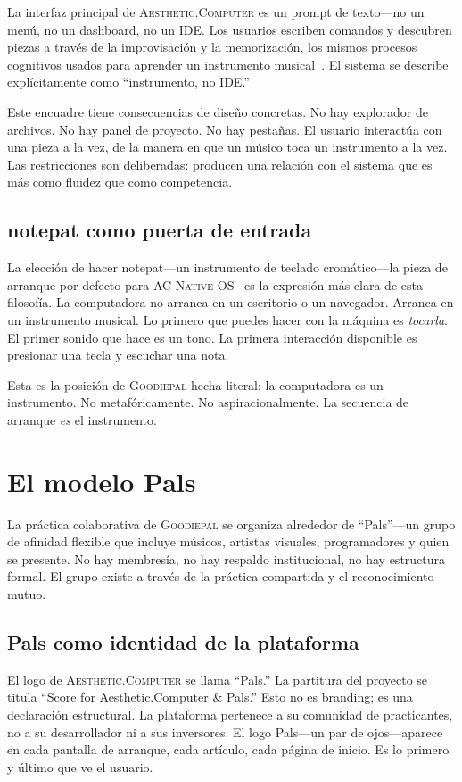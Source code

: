 \documentclass[10pt,letterpaper,twocolumn]{article}
\newcommand{\ac}{\textsc{Aesthetic.Computer}}
\newcommand{\acos}{\textsc{AC Native OS}}
\newcommand{\gp}{\textsc{Goodiepal}}
\begin{document}
La interfaz principal de \ac{} es un prompt de texto---no un menú, no un dashboard, no un IDE. Los usuarios escriben comandos y descubren piezas a través de la improvisación y la memorización, los mismos procesos cognitivos usados para aprender un instrumento musical~\citep{scudder2026ac}. El sistema se describe explícitamente como ``instrumento, no IDE.''

Este encuadre tiene consecuencias de diseño concretas. No hay explorador de archivos. No hay panel de proyecto. No hay pestañas. El usuario interactúa con una pieza a la vez, de la manera en que un músico toca un instrumento a la vez. Las restricciones son deliberadas: producen una relación con el sistema que es más como fluidez que como competencia.

\subsection{notepat como puerta de entrada}

La elección de hacer notepat---un instrumento de teclado cromático---la pieza de arranque por defecto para \acos{}~\citep{scudder2026notepat} es la expresión más clara de esta filosofía. La computadora no arranca en un escritorio o un navegador. Arranca en un instrumento musical. Lo primero que puedes hacer con la máquina es \emph{tocarla}. El primer sonido que hace es un tono. La primera interacción disponible es presionar una tecla y escuchar una nota.

Esta es la posición de \gp{} hecha literal: la computadora es un instrumento. No metafóricamente. No aspiracionalmente. La secuencia de arranque \emph{es} el instrumento.

\section{El modelo Pals}

La práctica colaborativa de \gp{} se organiza alrededor de ``Pals''---un grupo de afinidad flexible que incluye músicos, artistas visuales, programadores y quien se presente. No hay membresía, no hay respaldo institucional, no hay estructura formal. El grupo existe a través de la práctica compartida y el reconocimiento mutuo.

\subsection{Pals como identidad de la plataforma}

El logo de \ac{} se llama ``Pals.'' La partitura del proyecto se titula ``Score for Aesthetic.Computer \& Pals.'' Esto no es branding; es una declaración estructural. La plataforma pertenece a su comunidad de practicantes, no a su desarrollador ni a sus inversores. El logo Pals---un par de ojos---aparece en cada pantalla de arranque, cada artículo, cada página de inicio. Es lo primero y último que ve el usuario.
\end{document}
